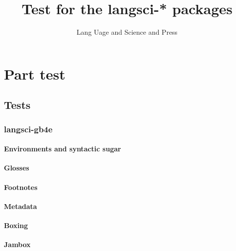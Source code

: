 \documentclass[output=book
  ,colorlinks
  ,showindex
    ,tblseight
  ]{langscibook}
\title{Test for the langsci-* packages}
\author{Lang Uage and Science and Press}
\begin{document}
\renewcommand{\lsImpressumExtra}{Manuscript submitted in fulfillment of entering the Galactical Hall of Fame.}


\maketitle
\tableofcontents
\mainmatter

%
\part{Part test}
\chapter{Tests}
\section{langsci-gb4e}
\subsection{Environments and syntactic sugar}










% 
% 
\subsection{Glosses}






\subsection{Footnotes}



\subsection{Metadata}

\subsection{Boxing}

\subsection{Jambox}

\end{document}
